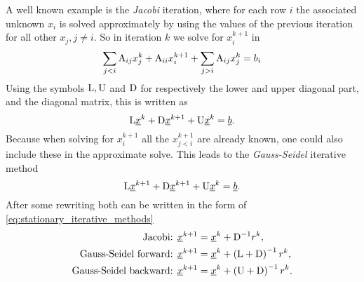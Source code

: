 A well known example is the
\emph{Jacobi} iteration, where for each row $i$ the associated unknown $x_i$ 
is solved approximately by using the values of the previous iteration 
for all other $x_j, j\neq i$. So in iteration $k$ we solve for $x^{k+1}_i$ in
\begin{equation*}
  \sum_{j<i} \mathrm{A}_{ij} x^k_j + \mathrm{A}_{ii} x^{k+1}_i +
  \sum_{j>i} \mathrm{A}_{ij} x^k_j = b_i
\end{equation*}
Using the symbols $\mathrm{L}, \mathrm{U}$ and $\mathrm{D}$ for respectively 
the lower and upper diagonal part, and the diagonal matrix, 
this is written as
\begin{equation*}
  \mathrm{L} \underline{x}^k +
  \mathrm{D} \underline{x}^{k+1} +
  \mathrm{U} \underline{x}^k = \underline{b}.
\end{equation*}
Because when solving for $x^{k+1}_i$ all the $x^{k+1}_{j<i}$ are already 
known, one could also include these in the approximate solve. This leads 
to the \emph{Gauss-Seidel} iterative method
\begin{equation*}
  \mathrm{L} \underline{x}^{k+1} +
  \mathrm{D} \underline{x}^{k+1} +
  \mathrm{U} \underline{x}^k = \underline{b}.
\end{equation*}
After some rewriting both can be written in the form of 
\eqref{eq:stationary_iterative_methods}
\begin{equation}
\begin{split}
  \text{Jacobi:   } & \underline{x}^{k+1}=\underline{x}^k + \mathrm{D}^{-1} r^k, \\
  \text{Gauss-Seidel forward:  } & \underline{x}^{k+1}=\underline{x}^k + \left(\mathrm{L}+\mathrm{D}\right)^{-1} r^k, \\
  \text{Gauss-Seidel backward: } & \underline{x}^{k+1}=\underline{x}^k + \left(\mathrm{U}+\mathrm{D}\right)^{-1} r^k.
\end{split}
\end{equation}

